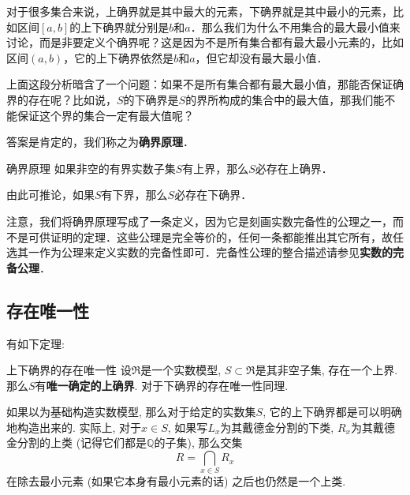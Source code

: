 对于很多集合来说，上确界就是其中最大的元素，下确界就是其中最小的元素，比如区间$[a, b]$的上下确界就分别是$b$和$a$．那么我们为什么不用集合的最大最小值来讨论，而是非要定义个确界呢？这是因为不是所有集合都有最大最小元素的，比如区间$(a, b)$，它的上下确界依然是$b$和$a$，但它却没有最大最小值．

上面这段分析暗含了一个问题：如果不是所有集合都有最大最小值，那能否保证确界的存在呢？比如说，$S$的下确界是$S$的界所构成的集合中的最大值，那我们能不能保证这个界的集合一定有最大值呢？

答案是肯定的，我们称之为\textbf{确界原理}．

\begin{definition}{确界原理}
如果非空的有界实数子集$S$有上界，那么$S$必存在上确界．

由此可推论，如果$S$有下界，那么$S$必存在下确界．
\end{definition}

注意，我们将确界原理写成了一条定义，因为它是刻画实数完备性的公理之一，而不是可供证明的定理．这些公理是完全等价的，任何一条都能推出其它所有，故任选其一作为公理来定义实数的完备性即可．完备性公理的整合描述请参见\textbf{实数的完备公理}．

\subsection{存在唯一性}
有如下定理:

\begin{theorem}{上下确界的存在唯一性}
设$\mathfrak{R}$是一个实数模型, $S\subset\mathfrak{R}$是其非空子集, 存在一个上界. 那么$S$有\textbf{唯一确定的上确界}. 对于下确界的存在唯一性同理.
\end{theorem}

如果以为基础构造实数模型, 那么对于给定的实数集$S$, 它的上下确界都是可以明确地构造出来的. 实际上, 对于$x\in S$, 如果写$L_x$为其戴德金分割的下类, $R_x$为其戴德金分割的上类 (记得它们都是$\mathbb{Q}$的子集), 那么交集
$$
R=\bigcap_{x\in S}R_x
$$
在除去最小元素 (如果它本身有最小元素的话) 之后也仍然是一个上类.